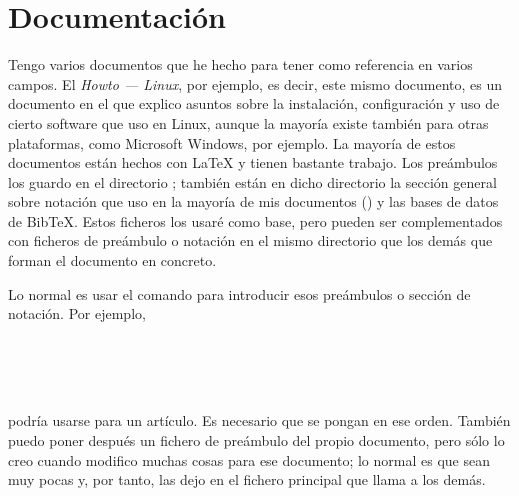 \section{Documentación}\label{sec:tex-doc}
Tengo varios documentos que he hecho para tener como referencia en varios campos. El \emph{Howto --- Linux}, por
ejemplo, es decir, este mismo documento, es un documento en el que explico asuntos sobre la instalación,
configuración y uso de cierto software que uso en Linux, aunque la mayoría existe también para otras
plataformas, como Microsoft Windows, por ejemplo. La mayoría de estos documentos están hechos con \LaTeX{} y
tienen bastante trabajo. Los preámbulos los guardo en el directorio
; también están en dicho directorio la sección general
sobre notación que uso en la mayoría de mis documentos () y las bases de datos de
BibTeX. Estos ficheros los usaré como base, pero pueden ser complementados con ficheros de preámbulo o notación
en el mismo directorio que los demás que forman el documento en concreto.

Lo normal es usar el comando \verb++ para introducir esos preámbulos o sección de notación. Por ejemplo,

\begin{lstlisting}[gobble=2,language=bash,style=bashinteract,escapechar=!]
  
  
  
  
\end{lstlisting}

\noindent podría usarse para un artículo. Es necesario que se pongan en ese orden. También puedo poner después
un fichero de preámbulo del propio documento, pero sólo lo creo cuando modifico muchas cosas para ese documento;
lo normal es que sean muy pocas y, por tanto, las dejo en el fichero principal que llama a los demás.

